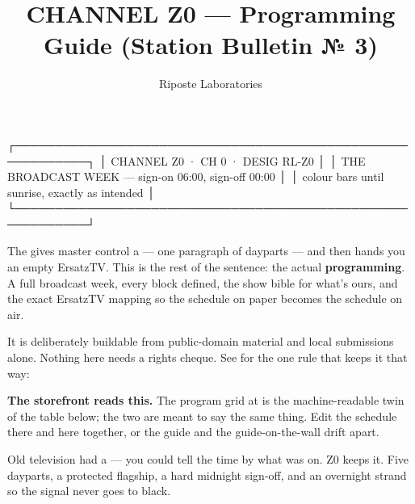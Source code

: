 \documentclass[fontpath=fonts/,logopath=logo/]{riposte-doc}
\title{CHANNEL Z0 — Programming Guide (Station Bulletin № 3)}
\author{Riposte Laboratories}
\date{}
\begin{document}
\ripmakehead

\riptoc

\ripcodeopen
{}
\begin{ripcodeblock}
┌───────────────────────────────────────────────────────────┐
│   CHANNEL Z0 · CH 0 · DESIG RL-Z0                         │
│   THE BROADCAST WEEK — sign-on 06:00, sign-off 00:00      │
│   colour bars until sunrise, exactly as intended          │
└───────────────────────────────────────────────────────────┘
\end{ripcodeblock}
\ripcodesizereset\ripcodeclose

The  gives master control a  — one paragraph of dayparts — and then hands you an empty ErsatzTV. This is the rest of the sentence: the actual \textbf{programming}. A full broadcast week, every block defined, the show bible for what's ours, and the exact ErsatzTV mapping so the schedule on paper becomes the schedule on air.

It is deliberately buildable from public-domain material and local submissions alone. Nothing here needs a rights cheque. See  for the one rule that keeps it that way: 

\begin{ripnote}
\textbf{The storefront reads this.} The program grid at  is the machine-readable twin of the table below; the two are meant to say the same thing. Edit the schedule there and here together, or the guide and the guide-on-the-wall drift apart.
\end{ripnote}



Old television had a  — you could tell the time by what was on. Z0 keeps it. Five dayparts, a protected flagship, a hard midnight sign-off, and an overnight strand so the signal never goes to black.
\end{document}
